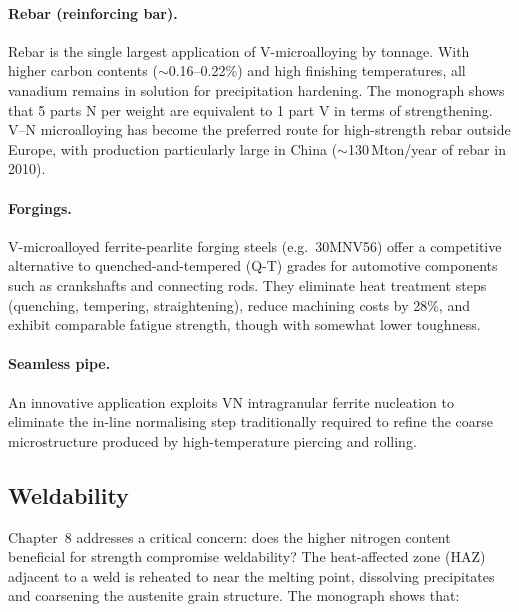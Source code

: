 \documentclass[11pt,a4paper]{article}
\begin{document}
\paragraph{Rebar (reinforcing bar).}  Rebar is the single largest
application of V-microalloying by tonnage.  With higher carbon contents
($\sim$0.16--0.22\%) and high finishing temperatures, all vanadium
remains in solution for precipitation hardening.  The monograph shows
that 5 parts N per weight are equivalent to 1 part V in terms of
strengthening.  V--N microalloying has become the preferred route for
high-strength rebar outside Europe, with production particularly large in
China ($\sim$130\,Mton/year of rebar in 2010).

\paragraph{Forgings.}  V-microalloyed ferrite-pearlite forging steels
(e.g.\ 30MNV56) offer a competitive alternative to quenched-and-tempered
(Q-T) grades for automotive components such as crankshafts and connecting
rods.  They eliminate heat treatment steps (quenching, tempering,
straightening), reduce machining costs by 28\%, and exhibit comparable
fatigue strength, though with somewhat lower toughness.

\paragraph{Seamless pipe.}  An innovative application exploits VN
intragranular ferrite nucleation to eliminate the in-line normalising
step traditionally required to refine the coarse microstructure produced
by high-temperature piercing and rolling.

\subsection{Weldability}

Chapter~8 addresses a critical concern: does the higher nitrogen content
beneficial for strength compromise weldability?  The heat-affected zone
(HAZ) adjacent to a weld is reheated to near the melting point, dissolving
precipitates and coarsening the austenite grain structure.  The monograph
shows that:
\end{document}
